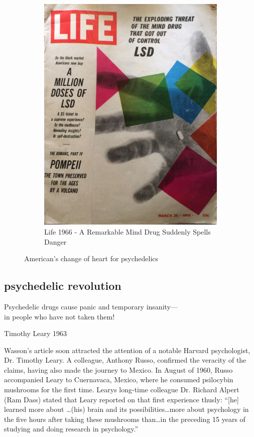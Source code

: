 \documentclass{UIdahoMastersThesis}
\begin{document}
\begin{figure}[h!]
\begin{subfigure}[b]{0.4\linewidth}
    \includegraphics[width=\linewidth]{life66.png}
    \caption{Life 1966 - A Remarkable Mind Drug Suddenly Spells Danger}
  \end{subfigure}
  \caption{American's change of heart for psychedelics}
  \label{fig:hofmann}
\end{figure}

\subsection{psychedelic revolution}
\epigraph {Psychedelic drugs cause panic and temporary insanity---\\
in people who have not taken them!}{Timothy Leary 1963}

\vspace{9mm}

Wasson's article soon attracted the attention of a notable Harvard psychologist, Dr. Timothy Leary. A colleague, Anthony Russo, confirmed the veracity of the claims, having also made the journey to Mexico. In August of 1960, Russo accompanied Leary to Cuernavaca, Mexico, where he consumed psilocybin mushrooms for the first time. Learys long-time colleague Dr. Richard Alpert (Ram Dass) stated that Leary reported on that first experience thusly: \enquote{[he] learned more about \ldots (his) brain and its possibilities\ldots more about psychology in the five hours after taking these mushrooms than\ldots in the preceding 15 years of studying and doing research in psychology.}  
\end{document}
